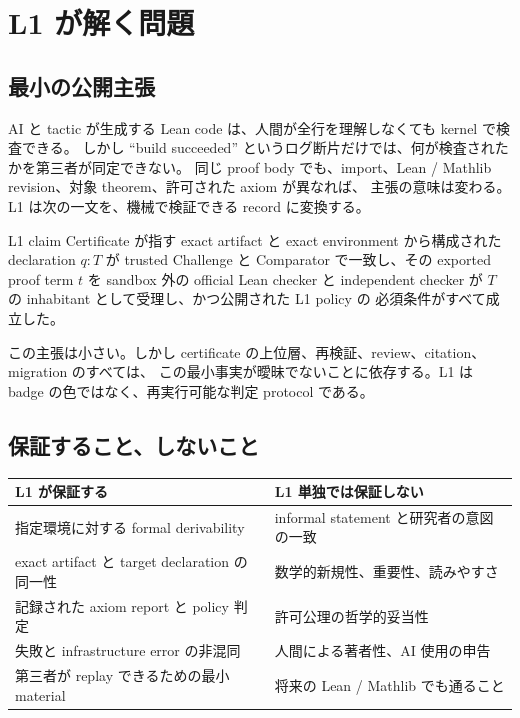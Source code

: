 \documentclass[a4paper,11pt]{ltjsarticle}
\begin{document}
\section{L1 が解く問題}

\subsection{最小の公開主張}

AI と tactic が生成する Lean code は、人間が全行を理解しなくても kernel で検査できる。
しかし ``build succeeded'' というログ断片だけでは、何が検査されたかを第三者が同定できない。
同じ proof body でも、import、Lean / Mathlib revision、対象 theorem、許可された axiom が異なれば、
主張の意味は変わる。L1 は次の一文を、機械で検証できる record に変換する。

\begin{principlebox}{L1 claim}
Certificate が指す exact artifact と exact environment から構成された declaration
\(q : T\) が trusted Challenge と Comparator で一致し、その exported proof term \(t\) を sandbox 外の
official Lean checker と independent checker が \(T\) の inhabitant として受理し、かつ公開された L1 policy の
必須条件がすべて成立した。
\end{principlebox}

この主張は小さい。しかし certificate の上位層、再検証、review、citation、migration のすべては、
この最小事実が曖昧でないことに依存する。L1 は badge の色ではなく、再実行可能な判定 protocol である。

\subsection{保証すること、しないこと}

\begin{tabularx}{\linewidth}{YY}
\toprule
\textbf{L1 が保証する} & \textbf{L1 単独では保証しない} \\
\midrule
指定環境に対する formal derivability & informal statement と研究者の意図の一致 \\
exact artifact と target declaration の同一性 & 数学的新規性、重要性、読みやすさ \\
記録された axiom report と policy 判定 & 許可公理の哲学的妥当性 \\
失敗と infrastructure error の非混同 & 人間による著者性、AI 使用の申告 \\
第三者が replay できるための最小 material & 将来の Lean / Mathlib でも通ること \\
\bottomrule
\end{tabularx}
\end{document}
